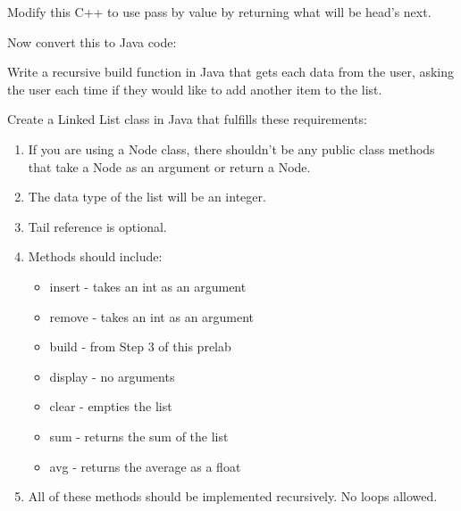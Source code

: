 \documentclass[../../main.tex]{subfiles}
\begin{document}
\begin{steps}
      Modify this C++ to use pass by value by returning what will be head's next.\\
      \vspace{10cm}
   \item Now convert this to Java code:\\
      \vspace{10cm}
   \item Write a recursive build function in Java that gets each data from the user, asking the user
      each time if they would like to add another item to the list.\\
      \vspace{10cm}
   \item Create a Linked List class in Java that fulfills these requirements:
   \begin{enumerate}[label=\Alph*.]
      \item If you are using a Node class, there shouldn't be any public
         class methods that take a Node as an argument or return a Node.
      \item The data type of the list will be an integer.
      \item Tail reference is optional.
      \item Methods should include:
         \begin{itemize}
            \item insert - takes an int as an argument
            \item remove - takes an int as an argument
            \item build - from Step 3 of this prelab
            \item display - no arguments
            \item clear - empties the list
            \item sum - returns the sum of the list
            \item avg - returns the average as a float
         \end{itemize}
      \item All of these methods should be implemented recursively. No loops allowed.
   \end{enumerate}
\end{steps}
\end{document}
